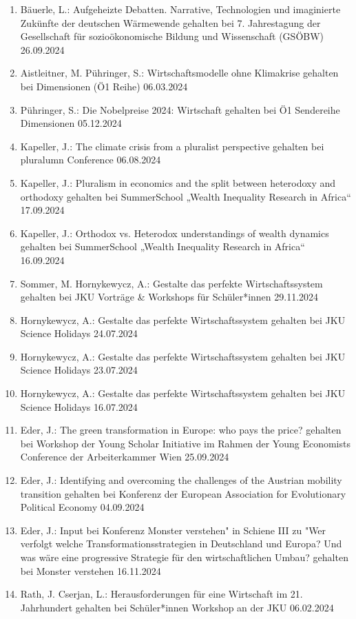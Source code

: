 \begin{enumerate}
	\item Bäuerle, L.: Aufgeheizte Debatten. Narrative, Technologien und imaginierte Zukünfte der deutschen Wärmewende gehalten bei 7. Jahrestagung der Gesellschaft für sozioökonomische Bildung und Wissenschaft (GSÖBW) 26.09.2024
	\item Aistleitner, M. Pühringer, S.: Wirtschaftsmodelle ohne Klimakrise gehalten bei Dimensionen (Ö1 Reihe) 06.03.2024
	\item Pühringer, S.: Die Nobelpreise 2024: Wirtschaft gehalten bei Ö1 Sendereihe \glqq Dimensionen\grqq{} 05.12.2024
	\item Kapeller, J.: The climate crisis from a pluralist perspective gehalten bei pluralumn Conference 06.08.2024
	\item Kapeller, J.: Pluralism in economics and the split between heterodoxy and orthodoxy gehalten bei SummerSchool „Wealth Inequality Research in Africa“ 17.09.2024
	\item Kapeller, J.: Orthodox vs. Heterodox understandings of wealth dynamics gehalten bei SummerSchool „Wealth Inequality Research in Africa“ 16.09.2024
	\item Sommer, M. Hornykewycz, A.: Gestalte das perfekte Wirtschaftssystem gehalten bei JKU Vorträge \& Workshops für Schüler*innen 29.11.2024
	\item Hornykewycz, A.: Gestalte das perfekte Wirtschaftssystem gehalten bei JKU Science Holidays 24.07.2024
	\item Hornykewycz, A.: Gestalte das perfekte Wirtschaftssystem gehalten bei JKU Science Holidays 23.07.2024
	\item Hornykewycz, A.: Gestalte das perfekte Wirtschaftssystem gehalten bei JKU Science Holidays 16.07.2024
	\item Eder, J.: The green transformation in Europe: who pays the price? gehalten bei Workshop der Young Scholar Initiative im Rahmen der Young Economists Conference der Arbeiterkammer Wien 25.09.2024
	\item Eder, J.: Identifying and overcoming the challenges of the Austrian mobility transition gehalten bei Konferenz der European Association for Evolutionary Political Economy 04.09.2024
	\item Eder, J.: Input bei Konferenz \glqq Monster verstehen" in Schiene III zu "Wer verfolgt welche Transformationsstrategien in Deutschland und Europa? Und was wäre eine progressive Strategie für den wirtschaftlichen Umbau?\grqq{} gehalten bei Monster verstehen 16.11.2024
	\item Rath, J. Cserjan, L.: Herausforderungen für eine Wirtschaft im 21. Jahrhundert gehalten bei Schüler*innen Workshop an der JKU 06.02.2024

\end{enumerate}
